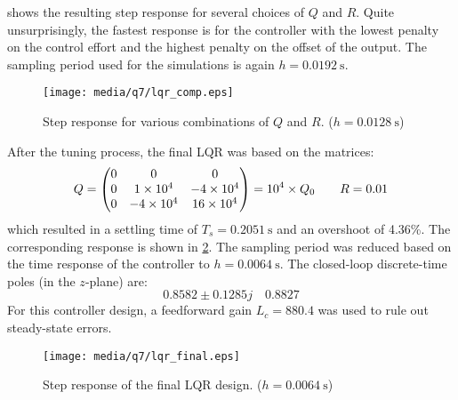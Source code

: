  shows the resulting step response for several choices of $Q$ and $R$. Quite unsurprisingly, the fastest response is for the controller with the lowest penalty on the control effort and the highest penalty on the offset of the output. The sampling period used for the simulations is again $h = \SI{0.0192}{\second}$.
\begin{figure}
    \centering
    \texttt{[image: media/q7/lqr\_comp.eps]}
    \caption{Step response for various combinations of $Q$ and $R$. ($h = \SI{0.0128}{\second}$)}
    \label{fig:q7_lqr_comp}
\end{figure}
After the tuning process, the final LQR was based on the matrices:
$$ Q = \mqty(0 & 0 & 0\\
             0 & \num{1e4} & -\num{4e4}\\
             0 & -\num{4e4} & \num{16e4}) = 10^4\times Q_0 \qquad R = 0.01$$
which resulted in a settling time of $T_s = \SI{0.2051}{\second}$ and an overshoot of 4.36\%. The corresponding response is shown in \cref{fig:q7_lqr_final}. The sampling period was reduced based on the time response of the controller to $h = \SI{0.0064}{\second}$. The closed-loop discrete-time poles (in the $z$-plane) are:
        $$0.8582 \pm 0.1285j\quad0.8827$$
For this controller design, a feedforward gain $L_c = 880.4$ was used to rule out steady-state errors. 
\begin{figure}
    \centering
    \texttt{[image: media/q7/lqr\_final.eps]}
    \caption{Step response of the final LQR design. ($h = \SI{0.0064}{\second}$)}
    \label{fig:q7_lqr_final}
\end{figure}